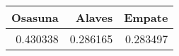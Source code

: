 \begin{tabular}{rrr}
\hline
   Osasuna &   Alaves &   Empate \\
\hline
  0.430338 & 0.286165 & 0.283497 \\
\hline
\end{tabular}